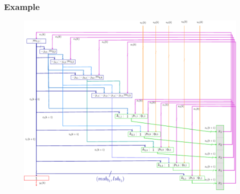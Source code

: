 \begin{frame}
	\frametitle{Example}
	\begin{figure}
		\includegraphics[scale=0.8, trim=5cm 0cm 0cm 5cm,clip]{pictures/exampleScheme.pdf}
	\end{figure}
\end{frame}
